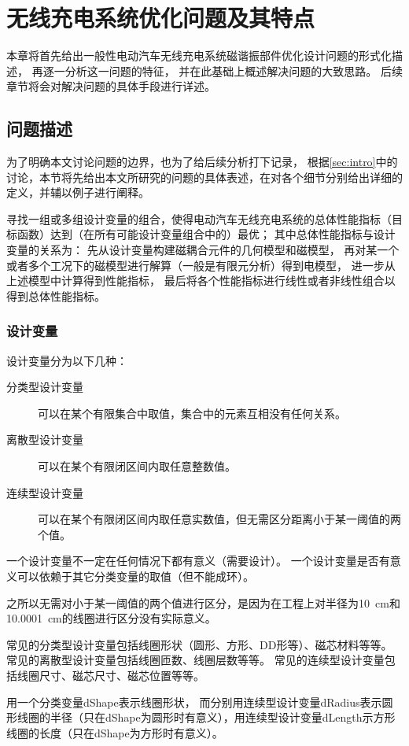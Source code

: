 \documentclass[index]{subfiles}
\begin{document}
\chapter{无线充电系统优化问题及其特点}\label{sec:fea}
本章将首先给出一般性电动汽车无线充电系统磁谐振部件优化设计问题的形式化描述，
再逐一分析这一问题的特征，
并在此基础上概述解决问题的大致思路。
后续章节将会对解决问题的具体手段进行详述。

\section{问题描述}
为了明确本文讨论问题的边界，也为了给后续分析打下记录，
根据\cref{sec:intro}中的讨论，本节将先给出本文所研究的问题的具体表述，在对各个细节分别给出详细的定义，并辅以例子进行阐释。

\begin{definition}[一般性电动汽车无线充电系统磁谐振部件单目标优化设计问题]\label{def:problem}
  寻找一组或多组设计变量的组合，使得电动汽车无线充电系统的总体性能指标（目标函数）达到（在所有可能设计变量组合中的）最优；
  其中总体性能指标与设计变量的关系为：
  先从设计变量构建磁耦合元件的几何模型和磁模型，
  再对某一个或者多个工况下的磁模型进行解算（一般是有限元分析）得到电模型，
  进一步从上述模型中计算得到性能指标，
  最后将各个性能指标进行线性或者非线性组合以得到总体性能指标。
\end{definition}

\subsection{设计变量}
\begin{definition}[设计变量]\label{def:dvars}
  设计变量分为以下几种：
  \begin{description}
    \item[分类型设计变量] 可以在某个有限集合中取值，集合中的元素互相没有任何关系。
    \item[离散型设计变量] 可以在某个有限闭区间内取任意整数值。
    \item[连续型设计变量] 可以在某个有限闭区间内取任意实数值，但无需区分距离小于某一阈值的两个值。
  \end{description}
  一个设计变量不一定在任何情况下都有意义（需要设计）。
  一个设计变量是否有意义可以依赖于其它分类变量的取值（但不能成环）。
\end{definition}
\begin{remark}[连续型设计变量的阈值]
  之所以无需对小于某一阈值的两个值进行区分，是因为在工程上对半径为\SI{10}{\centi\meter}和\SI{10.0001}{\centi\meter}的线圈进行区分没有实际意义。
\end{remark}
\begin{example}[设计变量的分类]
  常见的分类型设计变量包括线圈形状（圆形、方形、DD形等）、磁芯材料等等。
  常见的离散型设计变量包括线圈匝数、线圈层数等等。
  常见的连续型设计变量包括线圈尺寸、磁芯尺寸、磁芯位置等等。
\end{example}
\begin{example}[设计变量的依赖关系]
  用一个分类变量dShape表示线圈形状，
  而分别用连续型设计变量dRadius表示圆形线圈的半径（只在dShape为圆形时有意义），用连续型设计变量dLength示方形线圈的长度（只在dShape为方形时有意义）。
\end{example}
\end{document}
